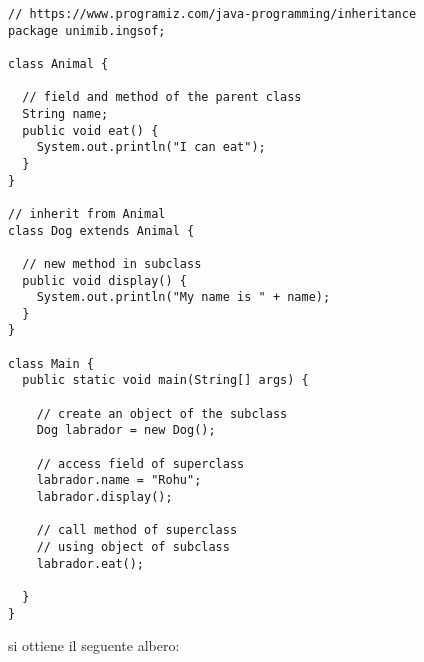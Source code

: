 \begin{verbatim}
// https://www.programiz.com/java-programming/inheritance
package unimib.ingsof;

class Animal {

  // field and method of the parent class
  String name;
  public void eat() {
    System.out.println("I can eat");
  }
}

// inherit from Animal
class Dog extends Animal {

  // new method in subclass
  public void display() {
    System.out.println("My name is " + name);
  }
}

class Main {
  public static void main(String[] args) {

    // create an object of the subclass
    Dog labrador = new Dog();

    // access field of superclass
    labrador.name = "Rohu";
    labrador.display();

    // call method of superclass
    // using object of subclass
    labrador.eat();

  }
}
\end{verbatim}

si ottiene il seguente albero:

